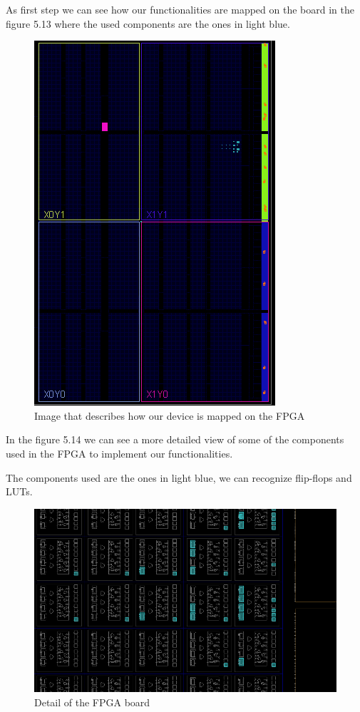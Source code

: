 \documentclass[a4paper]{report}
\begin{document}
\noindent As first step we can see how our functionalities are mapped on the board in the figure 5.13 where the used components are the ones in light blue.

\begin{figure}[htpb]
	\centering
	\includegraphics[scale=0.76]{img/vivado/fpga.png}
	\caption{Image that describes how our device is mapped on the FPGA}
\end{figure}

\noindent In the figure 5.14 we can see a more detailed view of some of the components used in the FPGA to implement our functionalities.

\noindent The components used are the ones in light blue, we can recognize flip-flops and LUTs.

\begin{figure}[htpb]
	\centering
	\includegraphics[scale=0.6]{img/vivado/fpga_detail.png}
	\caption{Detail of the FPGA board}
\end{figure}
\end{document}
